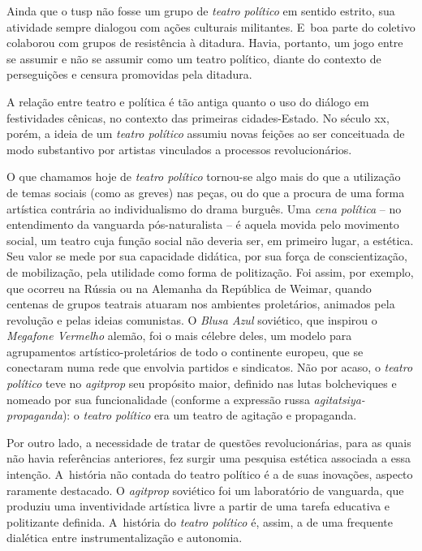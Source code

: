 \subject{Políticas do teatro}

Ainda que o {\sc tusp} não fosse um grupo de {\it teatro político} em sentido
estrito, sua atividade sempre dialogou
com ações culturais militantes. E~boa parte do coletivo colaborou com
grupos de resistência à ditadura. Havia, portanto, um jogo entre se
assumir e não se assumir como um teatro político, diante do contexto de
perseguições e censura promovidas pela ditadura.

A relação entre teatro e política é tão antiga quanto o uso do diálogo
em festividades cênicas, no contexto das primeiras cidades-Estado. No
século {\sc xx}, porém, a ideia de um {\it teatro político} assumiu novas feições
ao ser conceituada de modo substantivo por artistas vinculados a processos revolucionários.

O que chamamos hoje de {\it teatro político} tornou-se algo mais do que
a utilização de temas sociais (como as greves) nas peças, ou do que a
procura de uma forma artística contrária ao individualismo do drama
burguês. Uma {\it cena política} -- no entendimento da vanguarda
pós-naturalista -- é aquela movida pelo movimento social, um teatro cuja
função social não deveria ser, em primeiro lugar, a estética. Seu valor
se mede por sua capacidade didática, por sua força de conscientização,
de mobilização, pela utilidade como forma de politização. Foi assim, por
exemplo, que ocorreu na Rússia ou na Alemanha da República de Weimar,
quando centenas de grupos teatrais atuaram nos ambientes proletários,
animados pela revolução e pelas ideias comunistas. O {\it Blusa Azul}
soviético, que inspirou o {\it Megafone Vermelho} alemão, foi o mais
célebre deles, um modelo para agrupamentos artístico-proletários de todo
o continente europeu, que se conectaram numa rede que envolvia partidos
e sindicatos. Não por acaso, o {\it teatro político} teve no
{\it agitprop} seu propósito maior, definido nas lutas bolcheviques e
nomeado por sua funcionalidade (conforme a expressão russa
{\it agitatsiya-propaganda}): o {\it teatro político} era um teatro de
agitação e propaganda.

Por outro lado, a necessidade de tratar de questões revolucionárias,
para as quais não havia referências anteriores, fez surgir uma pesquisa
estética associada a essa intenção. A~história não contada do teatro
político é a de suas inovações, aspecto raramente destacado. O
{\it agitprop} soviético foi um laboratório de vanguarda, que produziu uma
inventividade artística livre a partir de uma tarefa educativa e
politizante definida. A~história do {\it teatro político} é, assim, a de
uma frequente dialética entre instrumentalização e autonomia.

